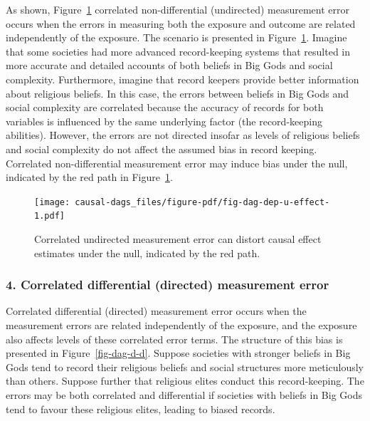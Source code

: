 \documentclass[
  singlecolumn]{article}
\begin{document}
As shown, Figure~\ref{fig-dag-dep-u-effect} correlated non-differential
(undirected) measurement error occurs when the errors in measuring both
the exposure and outcome are related independently of the exposure. The
scenario is presented in Figure~\ref{fig-dag-dep-u-effect}. Imagine that
some societies had more advanced record-keeping systems that resulted in
more accurate and detailed accounts of both beliefs in Big Gods and
social complexity. Furthermore, imagine that record keepers provide
better information about religious beliefs. In this case, the errors
between beliefs in Big Gods and social complexity are correlated because
the accuracy of records for both variables is influenced by the same
underlying factor (the record-keeping abilities). However, the errors
are not directed insofar as levels of religious beliefs and social
complexity do not affect the assumed bias in record keeping. Correlated
non-differential measurement error may induce bias under the null,
indicated by the red path in Figure~\ref{fig-dag-dep-u-effect}.

\begin{figure}

{\centering \texttt{[image: causal-dags\_files/figure-pdf/fig-dag-dep-u-effect-1.pdf]}

}

\caption{\label{fig-dag-dep-u-effect}Correlated undirected measurement
error can distort causal effect estimates under the null, indicated by
the red path.}

\end{figure}

\hypertarget{correlated-differential-directed-measurement-error}{%
\subsubsection{4. Correlated differential (directed) measurement
error}\label{correlated-differential-directed-measurement-error}}

Correlated differential (directed) measurement error occurs when the
measurement errors are related independently of the exposure, and the
exposure also affects levels of these correlated error terms. The
structure of this bias is presented in Figure~\ref{fig-dag-d-d}. Suppose
societies with stronger beliefs in Big Gods tend to record their
religious beliefs and social structures more meticulously than others.
Suppose further that religious elites conduct this record-keeping. The
errors may be both correlated and differential if societies with beliefs
in Big Gods tend to favour these religious elites, leading to biased
records.
\end{document}
